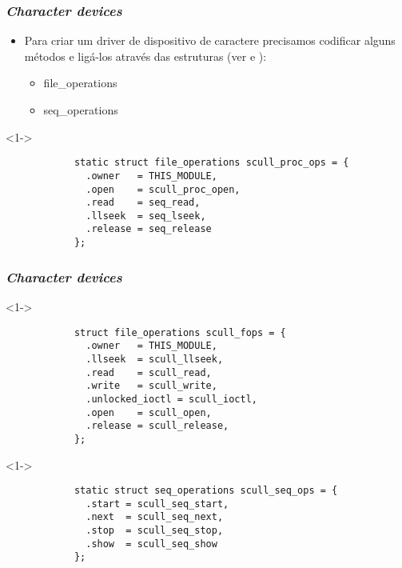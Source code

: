 \begin{frame}[fragile]
	\frametitle{\textit{Character devices}}
	
	\begin{itemize}
		\item<1-> Para criar um driver de dispositivo de caractere precisamos codificar alguns métodos e ligá-los através das estruturas (ver \cite{LinuxDrivers} e \cite{LDD3_3x}):
		\begin{itemize}
			\item<1-> file\_operations
			\item<1-> seq\_operations
		\end{itemize}
	\end{itemize}

	\lstset{language=C}
	
	\begin{block}<1->{}
		\begin{lstlisting}
			static struct file_operations scull_proc_ops = {
			  .owner   = THIS_MODULE,
			  .open    = scull_proc_open,
			  .read    = seq_read,
			  .llseek  = seq_lseek,
			  .release = seq_release
			};
		\end{lstlisting}
	\end{block}

\end{frame}


\begin{frame}[fragile]
	\frametitle{\textit{Character devices}}
	
	\lstset{language=C}

	\begin{block}<1->{}
		\begin{lstlisting}
			struct file_operations scull_fops = {
			  .owner   = THIS_MODULE,
			  .llseek  = scull_llseek,
			  .read    = scull_read,
			  .write   = scull_write,
			  .unlocked_ioctl = scull_ioctl,
			  .open    = scull_open,
			  .release = scull_release,
			};
		\end{lstlisting}
	\end{block}

	\begin{block}<1->{}
		\begin{lstlisting}
			static struct seq_operations scull_seq_ops = {
			  .start = scull_seq_start,
			  .next  = scull_seq_next,
			  .stop  = scull_seq_stop,
			  .show  = scull_seq_show
			};
		\end{lstlisting}
	\end{block}

\end{frame}


